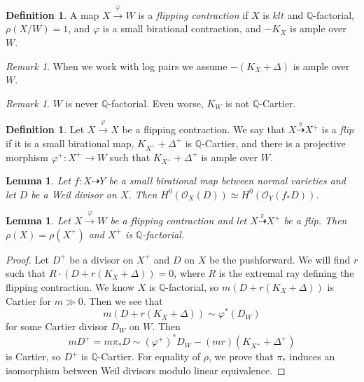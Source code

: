 \documentclass[leqno, openany]{memoir}
\newtheorem{lem}[thm]{Lemma}
\theoremstyle{definition}
\newtheorem{defn}[thm]{Definition}
\theoremstyle{remark}
\newtheorem{rmk}[thm]{Remark}
\theoremstyle{plain}
\theoremstyle{definition}
\theoremstyle{remark}
\newcommand{\Q}{\mathbb{Q}}
\newcommand{\mc}[1]{\mathcal{#1}}
\begin{document}
\begin{defn}
    A map $X \xrightarrow{\varphi} W$ is a \textit{flipping contraction} if $X$ is $klt$ and $\Q$-factorial, $\rho(X/W) = 1$, and $\varphi$ is a small birational contraction, and $-K_X$ is ample over $W$.
\end{defn}

\begin{rmk}
    When we work with log pairs we assume $-(K_X + \Delta)$ is ample over $W$.
\end{rmk}

\begin{rmk}
    $W$ is never $\Q$-factorial. Even worse, $K_W$ is not $\Q$-Cartier.
\end{rmk}

\begin{defn}
    Let $X \xrightarrow{\varphi} X$ be a flipping contraction. We say that $X \overset{\pi}{\dashrightarrow} X^+$ is a \textit{flip} if it is a small birational map, $K_{X^+} + \Delta^+$ is $\Q$-Cartier, and there is a projective morphism $\varphi^+ \colon X^+ \to W$ such that $K_{X^+} + \Delta^+$ is ample over $W$.
\end{defn}

\begin{lem}
    Let $f \colon X \dashrightarrow Y$ be a small birational map between normal varieties and let $D$ be a Weil divisor on $X$. Then $H^0(\mc{O}_X(D)) \simeq H^0(\mc{O}_Y(f_* D))$.
\end{lem}

\begin{lem}
    Let $X \xrightarrow{\varphi} W$ be a flipping contraction and let $X \overset{\pi}{\dashrightarrow} X^+$ be a flip. Then $\rho(X) = \rho(X^+)$ and $X^+$ is $\Q$-factorial.
\end{lem}

\begin{proof}
    Let $D^+$ be a divisor on $X^+$ and $D$ on $X$ be the pushforward. We will find $r$ such that $R \cdot (D + r(K_X + \Delta)) = 0$, where $R$ is the extremal ray defining the flipping contraction. We know $X$ is $\Q$-factorial, so $m(D + r(K_X + \Delta))$ is Cartier for $m \gg 0$. Then we see that
    \[ m(D + r(K_X + \Delta)) \sim \varphi^*(D_W) \]
    for some Cartier divisor $D_W$ on $W$. Then 
    \[ mD^+ = m \pi_* D \sim {(\varphi^+)}^* D_W - (mr)(K_{X^+} + \Delta^+) \]
    is Cartier, so $D^+$ is $\Q$-Cartier. For equality of $\rho$, we prove that $\pi_*$ induces an isomorphism between Weil divisors modulo linear equivalence.
\end{proof}
\end{document}
